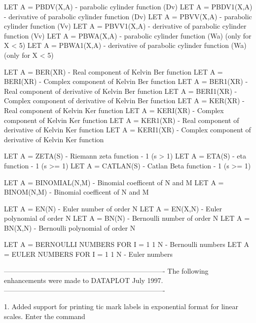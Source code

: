 {     LET A = PBDV(X,A)         - parabolic cylinder function (Dv)
     LET A = PBDV1(X,A)        - derivative of parabolic cylinder
                                 function (Dv)
     LET A = PBVV(X,A)         - parabolic cylinder function (Vv)
     LET A = PBVV1(X,A)        - derivative of parabolic cylinder
                                 function (Vv)
     LET A = PBWA(X,A)         - parabolic cylinder function (Wa) (only for X < 5)
     LET A = PBWA1(X,A)        - derivative of parabolic cylinder
                                 function (Wa) (only for X < 5)

     LET A = BER(XR)           - Real component of Kelvin Ber function
     LET A = BERI(XR)          - Complex component of Kelvin Ber function
     LET A = BER1(XR)          - Real component of derivative of Kelvin Ber
                                 function
     LET A = BERI1(XR)         - Complex component of derivative of Kelvin Ber
                                 function
     LET A = KER(XR)           - Real component of Kelvin Ker function
     LET A = KERI(XR)          - Complex component of Kelvin Ker function
     LET A = KER1(XR)          - Real component of derivative of Kelvin Ker
                                 function
     LET A = KERI1(XR)         - Complex component of derivative of Kelvin Ker
                                 function

     LET A = ZETA(S)           - Riemann zeta function - 1 (s > 1)
     LET A = ETA(S)            - eta function - 1 (s >= 1)
     LET A = CATLAN(S)         - Catlan Beta function - 1 (s >= 1)

     LET A = BINOMIAL(N,M)     - Binomial coefficent of N and M
     LET A = BINOM(N,M)        - Binomial coefficent of N and M

     LET A = EN(N)             - Euler number of order N
     LET A = EN(X,N)           - Euler polynomial of order N
     LET A = BN(N)             - Bernoulli number of order N
     LET A = BN(X,N)           - Bernoulli polynomial of order N

     LET A = BERNOULLI NUMBERS FOR I = 1 1 N - Bernoulli numbers
     LET A = EULER NUMBERS FOR I = 1 1 N     - Euler numbers


----------------------------------------------------------------------
The following enhancements were made to DATAPLOT July            1997.
----------------------------------------------------------------------

 1. Added support for printing tic mark labels in exponential
    format for linear scales.  Enter the command

}
